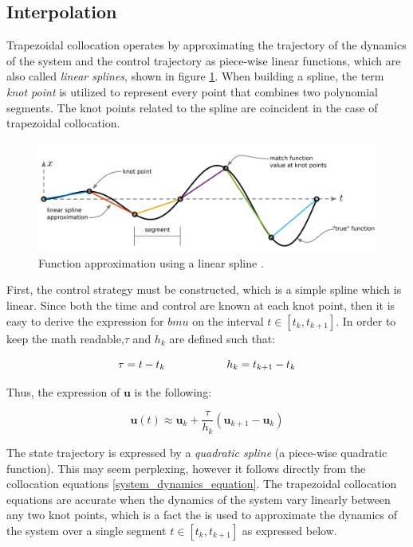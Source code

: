 \documentclass{thesisreport}
\begin{document}
 \newpage
 
 
 \subsection{Interpolation}
 
 Trapezoidal collocation operates by approximating the trajectory of the dynamics of the system and the control trajectory as piece-wise linear functions, which are also called \textit{linear splines}, shown in figure \ref{function_approximation_a}. When building a spline, the term \textit{knot point} is utilized to represent every point that combines two polynomial segments. The knot points related to the spline are coincident in the case of trapezoidal collocation.  
 
 
 \begin{figure}[h]
 \centering
 \includegraphics[width=\textwidth]{Images/Trajectory/Function_approximation_a}
 \caption{Function approximation using a linear spline \cite{Kelly2017}.}
 \label{function_approximation_a}
 \end{figure}
 
 
 First, the control strategy must be constructed, which is a simple spline which is linear. Since both the time and control are known at each knot point, then it is easy to derive the expression for $bm{u}$ on the interval $t \in [t_k,t_{k+1}]$. In order to keep the math readable,$\tau$ and $h_k$ are defined such that:
 
 \begin{equation*}
 	\tau = t-t_k \text{\hspace{2cm}}h_k = t_{k+1} - t_k
 \end{equation*}
   
 Thus, the expression of $\bm{u}$ is the following:
 
 \begin{equation}\label{spline_a}
 	\bm{u}(t) \approx \bm{u}_k + \frac{\tau}{h_k}(\bm{u}_{k+1}-\bm{u}_k)
 \end{equation}
 
 
 The state trajectory is expressed by a \textit{quadratic spline} (a piece-wise quadratic function). This may seem perplexing, however it follows directly from the collocation equations \ref{system_dynamics_equation}. The trapezoidal collocation equations are accurate when the dynamics of the system vary linearly between any two knot points, which is a fact the is used to approximate the dynamics of the system over a single segment $t \in [t_k, t_{k+1}]$ as expressed below.
 
\end{document}
